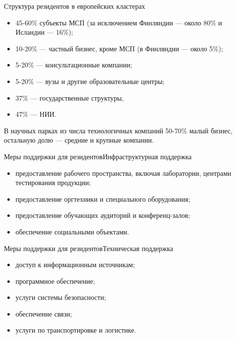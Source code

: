 \documentclass[_Venture_p3.tex]{subfiles}
\begin{document}
 


\begin{frame}[allowframebreaks]{Структура резидентов в европейских кластерах}{}
\begin{itemize}
	\item 45-60\% субъекты МСП (за исключением Финляндии — около 80\% и Исландии — 16\%); 
	\item 10-20\% — частный бизнес, кроме МСП (в Финляндии — около 5\%); 
	\item 5-20\% — консультационные компании; 

	\pagebreak
	\item 5-20\% — вузы и другие образовательные центры; 
	\item 37\% — государственные структуры, 
	\item 47\% — НИИ.
\end{itemize}

В научных парках из числа технологичных компаний 50-70\% малый бизнес, остальную долю — средние и крупные компании.
\end{frame}

 


\begin{frame}[allowframebreaks]{Меры поддержки для резидентов}{Инфраструктурная поддержка}
\begin{itemize}
	\item предоставление рабочего пространства, включая лаборатории, центрами тестирования продукции;
	\item предоставление оргтехники и специального оборудования;
	
	\pagebreak
	\item предоставление обучающих аудиторий и конференц-залов;
	\item обеспечение социальными объектами.
\end{itemize}
\end{frame}

 


\begin{frame}[allowframebreaks]{Меры поддержки для резидентов}{Техническая поддержка}
\begin{itemize}
	\item доступ к информационным источникам;
	\item программное обеспечение;
	\item услуги системы безопасности;
	
	\pagebreak
	\item обеспечение связи;
	\item услуги по транспортировке и логистике.
\end{itemize}
\end{frame}
\end{document}
